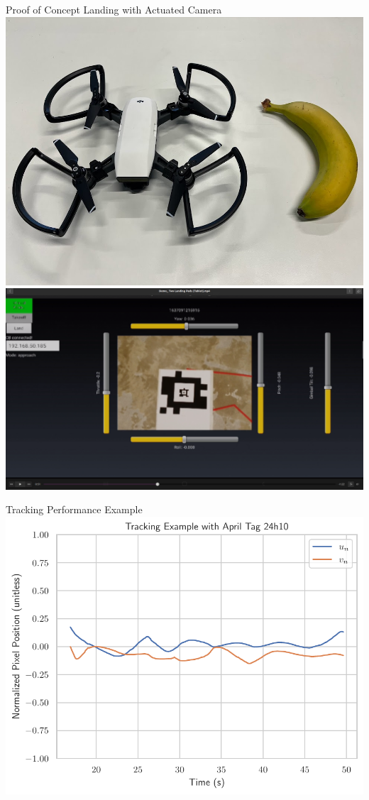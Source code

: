\documentclass[aspectratio=169]{beamer}
\begin{document}
\begin{frame}{Proof of Concept Landing with Actuated Camera}
    \centering
    \includegraphics[height=0.55\textheight]{./images/dji_spark}
    \includegraphics[height=0.55\textheight]{./images/tablet_screenshot}
\end{frame}

\begin{frame}{Tracking Performance Example}
	\centering
	\includegraphics[height=\textheight]{./images/tracking_example}
\end{frame}
\end{document}
